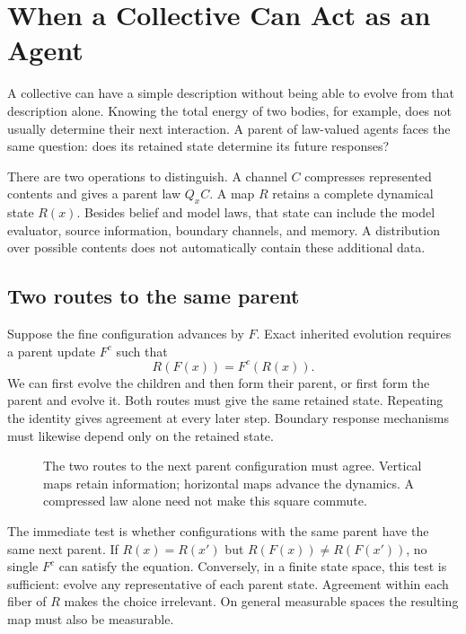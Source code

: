 \chapter{When a Collective Can Act as an Agent}
\label{comp:inheritance}

A collective can have a simple description without being able to evolve from
that description alone. Knowing the total energy of two bodies, for example,
does not usually determine their next interaction. A parent of law-valued
agents faces the same question: does its retained state determine its future
responses?

There are two operations to distinguish. A channel $C$ compresses represented
contents and gives a parent law $Q_xC$. A map $R$ retains a complete dynamical
state $R(x)$. Besides belief and model laws, that state can include the model
evaluator, source information, boundary channels, and memory. A distribution
over possible contents does not automatically contain these additional data.

\section{Two routes to the same parent}

Suppose the fine configuration advances by $F$. Exact inherited evolution
requires a parent update $F^c$ such that
\begin{equation}
 R(F(x))=F^c(R(x)).
\end{equation}
We can first evolve the children and then form their parent, or first form
the parent and evolve it. Both routes must give the same retained state.
Repeating the identity gives agreement at every later step. Boundary response
mechanisms must likewise depend only on the retained state.

\begin{figure}[t]
\centering

\caption{The two routes to the next parent configuration must agree.
Vertical maps retain information; horizontal maps advance the dynamics.
A compressed law alone need not make this square commute.}
\label{fig:comp-inheritance}
\end{figure}

The immediate test is whether configurations with the same parent have the
same next parent. If $R(x)=R(x')$ but $R(F(x))\ne R(F(x'))$, no single
$F^c$ can satisfy the equation. Conversely, in a finite state space, this
test is sufficient: evolve any representative of each parent state.
Agreement within each fiber of $R$ makes the choice irrelevant. On general
measurable spaces the resulting map must also be measurable.

